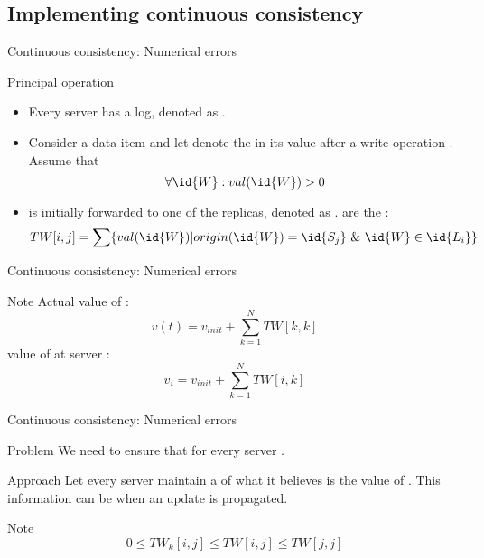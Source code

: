 \subsection{Implementing continuous consistency}
\begin{slide}{Continuous consistency: Numerical errors}
  \begin{block}{Principal operation}
    \begin{itemize}
    \item Every server  has a log, denoted as .
    \item Consider a data item  and let  denote the  in its value
      after a write operation . Assume that \[\forall \id{W}: val(\id{W}) > 0\]
    \item {} is initially forwarded to one of the  replicas, denoted as .  are
      the :
      \[TW[i,j] = \sum \{ val(\id{W}) | origin(\id{W}) = \id{S_j} \mbox{\ \&\ } \id{W} \in \id{L_i} \}\]
    \end{itemize}
  \end{block}
\end{slide}
\begin{slide}{Continuous consistency: Numerical errors}
  \begin{alertblock}{Note}
    Actual value  of :
    \[v(t) = v_{init} + \sum_{k=1}^N TW[k,k]\]
    value  of  at server :\vspace*{-0.25cm}
    \[v_i = v_{init} + \sum_{k=1}^N TW[i,k]\]
  \end{alertblock}
\end{slide}
\begin{slide}{Continuous consistency: Numerical errors}
  \begin{alertblock}{Problem}
    We need to ensure that  for every server .
  \end{alertblock}
  \onslide
  \begin{block}{Approach}
    Let every server  maintain a   of what it believes is the value of
    . This information can be  when an update is propagated.
  \end{block}
  \onslide
  \begin{alertblock}{Note}
    \[0 \leq TW_k[i,j] \leq TW[i,j] \leq TW[j,j]\]
  \end{alertblock}
\end{slide}
